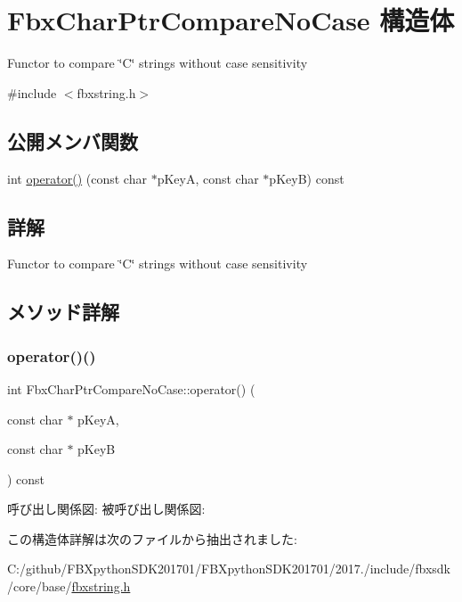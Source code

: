 \hypertarget{struct_fbx_char_ptr_compare_no_case}{}\section{Fbx\+Char\+Ptr\+Compare\+No\+Case 構造体}
\label{struct_fbx_char_ptr_compare_no_case}


Functor to compare \char`\"{}\+C\char`\"{} strings without case sensitivity  




{\ttfamily \#include $<$fbxstring.\+h$>$}

\subsection*{公開メンバ関数}
\begin{DoxyCompactItemize}
\item 
int \hyperlink{struct_fbx_char_ptr_compare_no_case_a23d4e5b52cb08b712b8f5a72f659bccc}{operator()} (const char $\ast$p\+KeyA, const char $\ast$p\+KeyB) const
\end{DoxyCompactItemize}


\subsection{詳解}
Functor to compare \char`\"{}\+C\char`\"{} strings without case sensitivity 

\subsection{メソッド詳解}
\mbox{\label{struct_fbx_char_ptr_compare_no_case_a23d4e5b52cb08b712b8f5a72f659bccc}} 
\subsubsection{\texorpdfstring{operator()()}{operator()()}}
{\footnotesize\ttfamily int Fbx\+Char\+Ptr\+Compare\+No\+Case\+::operator() (\begin{DoxyParamCaption}\item[{const char $\ast$}]{p\+KeyA,  }\item[{const char $\ast$}]{p\+KeyB }\end{DoxyParamCaption}) const}

呼び出し関係図\+:
被呼び出し関係図\+:


この構造体詳解は次のファイルから抽出されました\+:\begin{DoxyCompactItemize}
\item 
C\+:/github/\+F\+B\+Xpython\+S\+D\+K201701/\+F\+B\+Xpython\+S\+D\+K201701/2017./include/fbxsdk/core/base/\hyperlink{fbxstring_8h}{fbxstring.\+h}\end{DoxyCompactItemize}

